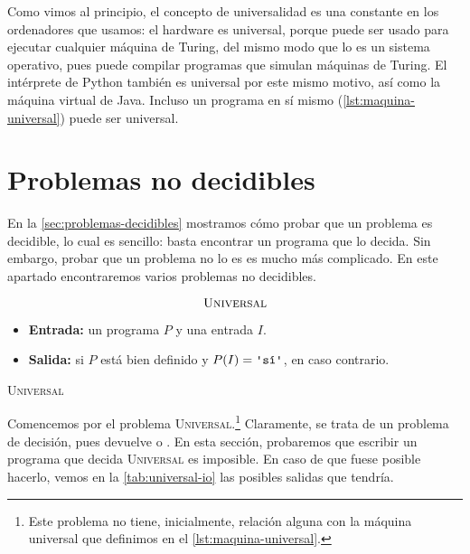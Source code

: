 Como vimos al principio, el concepto de universalidad es una constante en los ordenadores que usamos: el hardware es universal, porque puede ser usado para ejecutar cualquier máquina de Turing, del mismo modo que lo es un sistema operativo, pues puede compilar programas que simulan máquinas de Turing. El intérprete de Python también es universal por este mismo motivo, así como la máquina virtual de Java. Incluso un programa en sí mismo (\cref{lst:maquina-universal}) puede ser universal.

\section{Problemas no decidibles}\label{sec:problemas-no-decidibles}

En la \cref{sec:problemas-decidibles} mostramos cómo probar que un problema es decidible, lo cual es sencillo: basta encontrar un programa que lo decida. Sin embargo, probar que un problema no lo es es mucho más complicado. En este apartado encontraremos varios problemas no decidibles.
\vspace{8pt}
\begin{problema}
\begin{framed}
$$\text{\textsc{Universal}}$$

\begin{itemize}
    \item \textbf{Entrada:} un programa $P$ y una entrada $I$.
    \item \textbf{Salida:}  si $P$ está bien definido y $P(I)=\text{\palabra{sí}}$,  en caso contrario.
\end{itemize}
\end{framed}
\caption{\textsc{Universal}}
\label{prob:universal}
\end{problema}
Comencemos por el problema \textsc{Universal}.\footnote{Este problema no tiene, inicialmente, relación alguna con la máquina universal que definimos en el \cref{lst:maquina-universal}.} Claramente, se trata de un problema de decisión, pues devuelve  o . En esta sección, probaremos que escribir un programa que decida \textsc{Universal} es imposible. En caso de que fuese posible hacerlo, vemos en la \cref{tab:universal-io} las posibles salidas que tendría.
